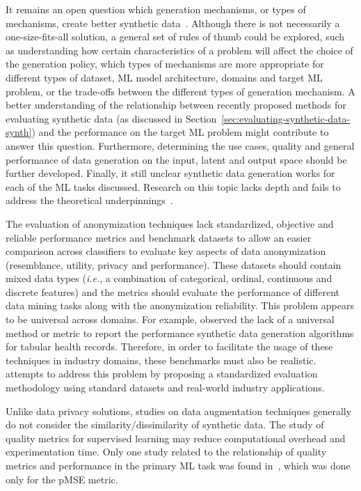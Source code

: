 It remains an open question which generation mechanisms, or types of
mechanisms, create better synthetic data~\cite{cheung2020modals}. Although
there is not necessarily a one-size-fits-all solution, a general set of rules
of thumb could be explored, such as understanding how certain characteristics
of a problem will affect the choice of the generation policy, which types of
mechanisms are more appropriate for different types of dataset, ML model
architecture, domains and target ML problem, or the trade-offs between the
different types of generation mechanism. A better understanding of the
relationship between recently proposed methods for evaluating synthetic data
(as discussed in Section~\ref{sec:evaluating-synthetic-data-synth}) and the
performance on the target ML problem might contribute to answer this question.
Furthermore, determining the use cases, quality and general performance of
data generation on the input, latent and output space should be further
developed. Finally, it still unclear  synthetic data generation
works for each of the ML tasks discussed. Research on this topic lacks depth
and fails to address the theoretical underpinnings~\cite{feng2021survey,
dao2019kernel}.

The evaluation of anonymization techniques lack standardized, objective and
reliable performance metrics and benchmark datasets to allow an easier
comparison across classifiers to evaluate key aspects of data anonymization
(resemblance, utility, privacy and performance). These datasets should contain
mixed data types (\textit{i.e.}, a combination of categorical, ordinal,
continuous and discrete features) and the metrics should evaluate the
performance of different data mining tasks along with the anonymization
reliability. This problem appears to be universal across domains. For example,
\citet{hernandez2022synthetic} observed the lack of a universal method or
metric to report the performance synthetic data generation algorithms for
tabular health records. Therefore, in order to facilitate the usage of these
techniques in industry domains, these benchmarks must also be
realistic. \citet{rosenblatt2020differentially} attempts to address this
problem by proposing a standardized evaluation methodology using standard
datasets and real-world industry applications.

Unlike data privacy solutions, studies on data augmentation techniques
generally do not consider the similarity/dissimilarity of synthetic data. The
study of quality metrics for supervised learning may reduce computational
overhead and experimentation time. Only one study related to the relationship
of quality metrics and performance in the primary ML task was found
in~\cite{dankar2021fake}, which was done only for the pMSE metric.

